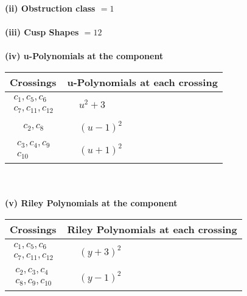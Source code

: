 \documentclass[1p]{elsarticle_modified}
\theoremstyle{definition}
\begin{document}
\flushleft \textbf{(ii) Obstruction class $= 1$}\\~\\
\flushleft \textbf{(iii) Cusp Shapes $= 12$}\\~\\
\newpage\renewcommand{\arraystretch}{1}
\flushleft \textbf{(iv) u-Polynomials at the component}\newline \\
\begin{tabular}{m{50pt}|m{274pt}}
Crossings & \hspace{64pt}u-Polynomials at each crossing \\
\hline $$\begin{aligned}c_{1},c_{5},c_{6}\\c_{7},c_{11},c_{12}\end{aligned}$$&$\begin{aligned}
&u^2+3
\end{aligned}$\\
\hline $$\begin{aligned}c_{2},c_{8}\end{aligned}$$&$\begin{aligned}
&(u-1)^2
\end{aligned}$\\
\hline $$\begin{aligned}c_{3},c_{4},c_{9}\\c_{10}\end{aligned}$$&$\begin{aligned}
&(u+1)^2
\end{aligned}$\\
\hline
\end{tabular}\\~\\
\newpage\renewcommand{\arraystretch}{1}
\flushleft \textbf{(v) Riley Polynomials at the component}\newline \\
\begin{tabular}{m{50pt}|m{274pt}}
Crossings & \hspace{64pt}Riley Polynomials at each crossing \\
\hline $$\begin{aligned}c_{1},c_{5},c_{6}\\c_{7},c_{11},c_{12}\end{aligned}$$&$\begin{aligned}
&(y+3)^2
\end{aligned}$\\
\hline $$\begin{aligned}c_{2},c_{3},c_{4}\\c_{8},c_{9},c_{10}\end{aligned}$$&$\begin{aligned}
&(y-1)^2
\end{aligned}$\\
\hline
\end{tabular}\\~\\
\end{document}
